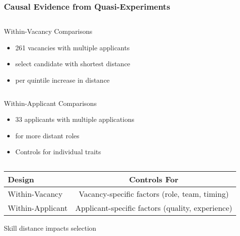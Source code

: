 \documentclass[aspectratio=169]{beamer}
\begin{document}
\begin{frame}
\frametitle{Causal Evidence from Quasi-Experiments}

\begin{comparison}
\begin{column}{0.48\textwidth}
\begin{block}{Within-Vacancy Comparisons}
\begin{itemize}
\item 261 vacancies with multiple applicants
\item {} select candidate with shortest distance
\item {} per quintile increase in distance
\end{itemize}
\end{block}
\end{column}

\begin{column}{0.48\textwidth}
\begin{block}{Within-Applicant Comparisons}
\begin{itemize}
\item 33 applicants with multiple applications
\item {} for more distant roles
\item Controls for individual traits
\end{itemize}
\end{block}
\end{column}
\end{comparison}
\vspace{1em}

\begin{center}
\begin{tabular}{|l|c|}
\hline
\headrow
\textbf{Design} & \textbf{Controls For} \\
\hline
Within-Vacancy & Vacancy-specific factors (role, team, timing) \\
Within-Applicant & Applicant-specific factors (quality, experience) \\
\hline
\end{tabular}
\end{center}

\begin{center}
Skill distance  impacts selection
\end{center}
\end{frame}
\end{document}
